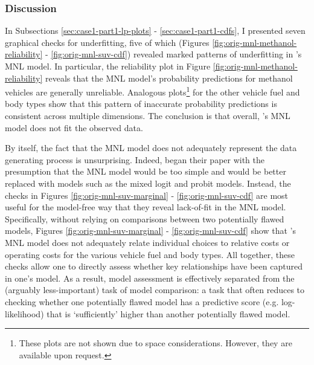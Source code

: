 \documentclass[preprint]{elsarticle}
\begin{document}
\subsubsection{Discussion}
\label{sec:case1-part1-discussion}
In Subsections \ref{sec:case1-part1-lp-plots} - \ref{sec:case1-part1-cdfs}, I presented seven graphical checks for underfitting, five of which (Figures \ref{fig:orig-mnl-methanol-reliability} - \ref{fig:orig-mnl-suv-cdf}) revealed marked patterns of underfitting in \citeauthor{brownstone_forecasting_1998}'s MNL model. In particular, the reliability plot in Figure \ref{fig:orig-mnl-methanol-reliability} reveals that the MNL model's probability predictions for methanol vehicles are generally unreliable. Analogous plots\footnote{These plots are not shown due to space considerations. However, they are available upon request.} for the other vehicle fuel and body types show that this pattern of inaccurate probability predictions is consistent across multiple dimensions. The conclusion is that overall, \citeauthor{brownstone_forecasting_1998}'s MNL model does not fit the observed data.

By itself, the fact that the MNL model does not adequately represent the data generating process is unsurprising. Indeed, \citet{brownstone_forecasting_1998} began their paper with the presumption that the MNL model would be too simple and would be better replaced with models such as the mixed logit and probit models. Instead, the checks in Figures \ref{fig:orig-mnl-suv-marginal} - \ref{fig:orig-mnl-suv-cdf} are most useful for the model-free way that they reveal lack-of-fit in the MNL model. Specifically, without relying on comparisons between two potentially flawed models, Figures \ref{fig:orig-mnl-suv-marginal} - \ref{fig:orig-mnl-suv-cdf} show that \citeauthor{brownstone_forecasting_1998}'s MNL model does not adequately relate individual choices to relative costs or operating costs for the various vehicle fuel and body types. All together, these checks allow one to directly assess whether key relationships have been captured in one's model. As a result, model assessment is effectively separated from the (arguably less-important) task of model comparison: a task that often reduces to checking whether one potentially flawed model has a predictive score (e.g. log-likelihood) that is `sufficiently' higher than another potentially flawed model.
\end{document}
